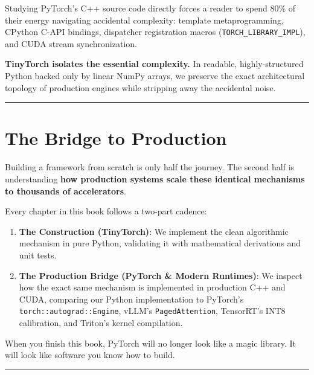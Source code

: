 \documentclass[
  letterpaper,
]{scrbook}
\providecommand{\tightlist}{%
  \setlength{\itemsep}{0pt}\setlength{\parskip}{0pt}}
\begin{document}
Studying PyTorch's C++ source code directly forces a reader to spend
80\% of their energy navigating accidental complexity: template
metaprogramming, CPython C-API bindings, dispatcher registration macros
(\texttt{TORCH\_LIBRARY\_IMPL}), and CUDA stream synchronization.

\textbf{TinyTorch isolates the essential complexity.} In readable,
highly-structured Python backed only by linear NumPy arrays, we preserve
the exact architectural topology of production engines while stripping
away the accidental noise.

\begin{center}\rule{0.5\linewidth}{0.5pt}\end{center}

\section*{The Bridge to Production}\label{the-bridge-to-production}


Building a framework from scratch is only half the journey. The second
half is understanding \textbf{how production systems scale these
identical mechanisms to thousands of accelerators}.

Every chapter in this book follows a two-part cadence:

\begin{enumerate}
\def\labelenumi{\arabic{enumi}.}
\tightlist
\item
  \textbf{The Construction (TinyTorch)}: We implement the clean
  algorithmic mechanism in pure Python, validating it with mathematical
  derivations and unit tests.
\item
  \textbf{The Production Bridge (PyTorch \& Modern Runtimes)}: We
  inspect how the exact same mechanism is implemented in production C++
  and CUDA, comparing our Python implementation to PyTorch's
  \texttt{torch::autograd::Engine}, vLLM's \texttt{PagedAttention},
  TensorRT's INT8 calibration, and Triton's kernel compilation.
\end{enumerate}

When you finish this book, PyTorch will no longer look like a magic
library. It will look like software you know how to build.

\begin{center}\rule{0.5\linewidth}{0.5pt}\end{center}
\end{document}
